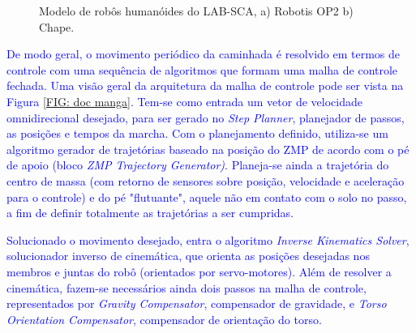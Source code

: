 \begin{figure}[phtb]
\centering
	\centering
\caption{Modelo de robôs humanóides do LAB-SCA, a) Robotis OP2 b) Chape.}
\label{FIG:darwinchape}
\end{figure}

\textcolor{blue}{De modo geral, o movimento periódico da caminhada é resolvido em termos de controle com uma sequência de algoritmos que formam uma malha de controle fechada. Uma visão geral da arquitetura da malha de controle pode ser vista na Figura \ref{FIG: doc manga}. Tem-se como entrada um vetor de velocidade omnidirecional desejado, para ser gerado no \textit{Step Planner}, planejador de passos, as posições e tempos da marcha. Com o planejamento definido, utiliza-se um algoritmo gerador de trajetórias baseado na posição do ZMP de acordo com o pé de apoio (bloco \textit{ZMP Trajectory Generator)}. Planeja-se ainda a trajetória do centro de massa (com retorno de sensores sobre posição, velocidade e aceleração para o controle) e do pé "flutuante", aquele não em contato com o solo no passo, a fim de definir totalmente as trajetórias a ser cumpridas.}

\textcolor{blue}{Solucionado o movimento desejado, entra o algoritmo \textit{Inverse Kinematics Solver}, solucionador inverso de cinemática, que orienta as posições desejadas nos membros e juntas do robô (orientados por servo-motores). Além de resolver a cinemática, fazem-se necessários ainda dois passos na malha de controle, representados por \textit{Gravity Compensator}, compensador de gravidade, e \textit{Torso Orientation Compensator}, compensador de orientação do torso.}

